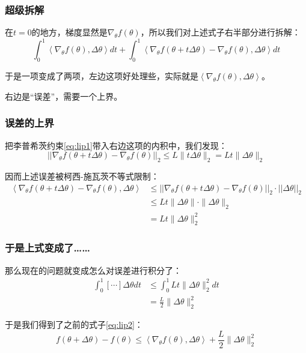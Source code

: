 \documentclass{ctexbeamer}
\begin{document}
\begin{frame}
    \frametitle{超级拆解}

    在$t=0$的地方，梯度显然是$\nabla_\theta f(\theta)$，所以我们对上述式子右半部分进行拆解：
    \begin{equation}
 \int_{0}^{1} \left\langle \nabla_\theta f(\theta), \Delta \theta \right\rangle dt + \int_{0}^{1} \left\langle \nabla_\theta f(\theta + t \Delta \theta) - \nabla_\theta f(\theta), \Delta \theta \right\rangle dt
    \end{equation}

    于是一项变成了两项，左边这项好处理些，实际就是$\left\langle \nabla_\theta f(\theta), \Delta \theta \right\rangle$。

    右边是“误差”，需要一个上界。

\end{frame}

\begin{frame}
    \frametitle{误差的上界}

    把李普希茨约束\ref{eq:lip1}带入右边这项的内积中，我们发现：
    \begin{equation}
\left|\left|\nabla_\theta f(\theta + t \Delta \theta) - \nabla_\theta f(\theta)\right|\right|_2 \leqslant L \|t\Delta \theta\|_2 = Lt \|\Delta \theta\|_2
    \end{equation}

    因而上述误差被柯西-施瓦茨不等式限制：
    \begin{align}
\left\langle \nabla_\theta f(\theta + t \Delta \theta) - \nabla_\theta f(\theta), \Delta \theta \right\rangle &\leqslant \left|\left|\nabla_\theta f(\theta + t \Delta \theta) - \nabla_\theta f(\theta)\right|\right|_2 \cdot \left|\left|\Delta \theta\right|\right|_2 \\ &\leqslant Lt \|\Delta \theta\| \cdot \|\Delta \theta\|_2 \\&= Lt \|\Delta \theta\|_2^2
    \end{align}

\end{frame}

\begin{frame}
    \frametitle{于是上式变成了……}

    那么现在的问题就变成怎么对误差进行积分了：
    \begin{align}
\int_0^1 \left[\cdots\right]\Delta\theta dt &\leqslant \int_0^1 Lt \|\Delta \theta\|_2^2 dt \\&= \frac{L}{2} \|\Delta \theta\|_2^2
    \end{align}

    于是我们得到了之前的式子\ref{eq:lip2}：
    \begin{equation}
        f(\theta + \Delta \theta) - f(\theta) \leqslant \left\langle \nabla_\theta f(\theta), \Delta \theta \right\rangle + \frac{L}{2} \|\Delta \theta\|_2^2
    \end{equation}

\end{frame}
\end{document}
